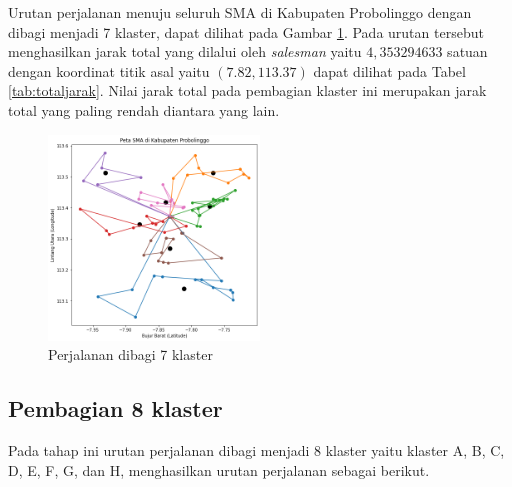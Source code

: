 Urutan perjalanan menuju seluruh SMA di Kabupaten Probolinggo dengan dibagi menjadi 7 klaster, dapat dilihat pada Gambar \ref{fig:hasil_mtsp7}. Pada urutan tersebut menghasilkan jarak total yang dilalui oleh \textit{salesman} yaitu $4,353294633$ satuan dengan koordinat titik asal yaitu $(7.82, 113.37)$ dapat dilihat pada Tabel \ref{tab:totaljarak}. Nilai jarak total pada pembagian klaster ini merupakan jarak total yang paling rendah diantara yang lain.

\begin{figure}[H]
\centering
\includegraphics[width=0.5\textwidth]{Gambar/hasil_mtsp/7}
\caption{Perjalanan dibagi 7 klaster}
\label{fig:hasil_mtsp7}
\end{figure}

\subsection{Pembagian 8 klaster}

Pada tahap ini urutan perjalanan dibagi menjadi 8 klaster yaitu klaster A, B, C, D, E, F, G, dan H, menghasilkan urutan perjalanan sebagai berikut.

